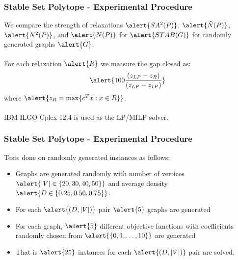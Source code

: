 \documentclass{beamer}
\begin{document}
\begin{frame}
\frametitle{Stable Set Polytope - Experimental Procedure}
We compare the strength of relaxations $\alert{SA^2(P)}$, $\alert{\tilde{N}(P)}$, $\alert{N^2(P)}$, and $\alert{N(P)}$ for $\alert{STAB(G)}$ for randomly generated graphs $\alert{G}$.\\\ \\
For each relaxation $\alert{R}$ we measure the gap closed as:
$$ \alert{100 \frac{(z_{LP} - z_{R})}{(z_{LP} - z_{IP})}}$$
where $\alert{z_R = \max\{c^Tx:x \in R\}}$.\\\ \\
IBM ILGO Cplex 12.4 is used as the LP/MILP solver.
\end{frame}

\begin{frame}
\frametitle{Stable Set Polytope - Experimental Procedure}
Tests done on randomly generated instances as follows:
\begin{itemize}
\item Graphs are generated randomly with number of vertices $\alert{|V| \in \{20,30,40,50\}}$ and average density $\alert{D \in \{0.25,0.50,0.75\}}$. 
\item For each $\alert{(D,|V|)}$ pair $\alert{5}$ graphs are generated
\item For each graph, $\alert{5}$ different objective functions with coefficients randomly chosen from $\alert{\{0,1,\dots,10\}}$ are generated
\item That is $\alert{25}$ instances for each $\alert{(D,|V|)}$ pair are solved.
\end{itemize}
\end{frame}
\end{document}

